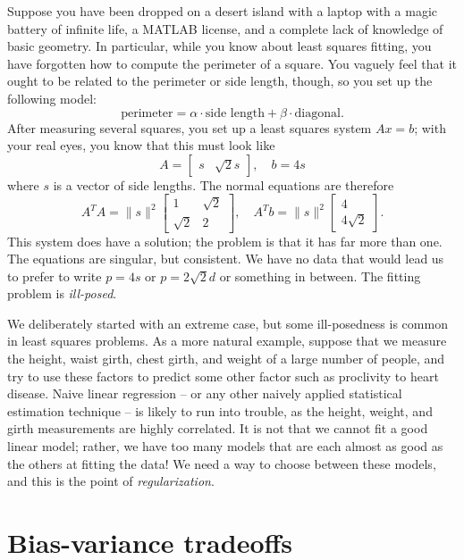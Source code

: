 \documentclass[12pt, leqno]{article} %
\begin{document}
Suppose you have been dropped on a desert island with a laptop with a magic
battery of infinite life, a MATLAB license, and a complete lack of
knowledge of basic geometry.  In particular, while you know about
least squares fitting, you have forgotten how to compute the perimeter
of a square.  You vaguely feel that it ought to be related to the
perimeter or side length, though, so you set up the following model:
\[
  \mbox{perimeter} = \alpha \cdot \mbox{side length} + \beta \cdot \mbox{diagonal}.
\]
After measuring several squares, you set up a least squares system
$Ax = b$; with your real eyes, you know that this must look
like
\[
  A = \begin{bmatrix} s & \sqrt{2} s \end{bmatrix}, \quad
  b = 4 s
\]
where $s$ is a vector of side lengths.  The normal equations are
therefore
\[
A^T A = \|s\|^2
\begin{bmatrix} 1 & \sqrt{2} \\ \sqrt{2} & 2 \end{bmatrix}, \quad
A^T b = \|s\|^2
\begin{bmatrix} 4 \\ 4 \sqrt{2} \end{bmatrix}.
\]
This system does have a solution; the problem is that it has far more
than one.  The equations are singular, but consistent.
We have no data that would lead us to prefer to write
$p = 4s$ or $p = 2 \sqrt{2} d$ or something in between.
The fitting problem is {\em ill-posed}.

We deliberately started with an extreme case, but some ill-posedness
is common in least squares problems.  As a more natural example,
suppose that we measure the height, waist girth, chest girth, and
weight of a large number of people, and try to use these factors to
predict some other factor such as proclivity to heart disease.  Naive
linear regression -- or any other naively applied statistical
estimation technique -- is likely to run into trouble, as the height,
weight, and girth measurements are highly correlated.  It is not that
we cannot fit a good linear model; rather, we have too many models
that are each almost as good as the others at fitting the data!  We
need a way to choose between these models, and this is the point of
{\em regularization}.

\section{Bias-variance tradeoffs}
\end{document}
